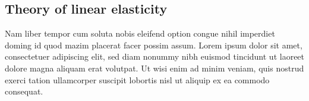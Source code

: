 %
\subsection{Theory of linear elasticity}
\label{sec:linearElasticity}
%
Nam liber tempor cum soluta nobis eleifend option congue nihil imperdiet doming 
id quod mazim placerat facer possim assum. Lorem ipsum dolor sit amet, 
consectetuer adipiscing elit, sed diam nonummy nibh euismod tincidunt ut 
laoreet dolore magna aliquam erat volutpat. Ut wisi enim ad minim veniam, quis 
nostrud exerci tation ullamcorper suscipit lobortis nisl ut aliquip ex ea 
commodo consequat. \cite{Duester2007}